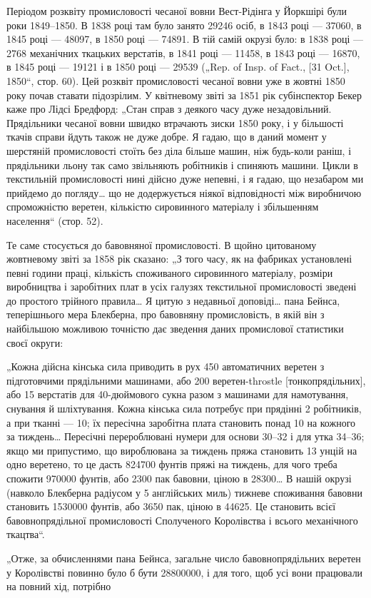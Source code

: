 
Періодом розквіту промисловості чесаної вовни Вест-Рідінга
у Йоркшірі були роки 1849--1850. В 1838 році там було занято
\num{29246} осіб, в 1843 році — \num{37060}, в 1845 році — \num{48097}, в 1850 році —
\num{74891}. В тій самій окрузі було: в 1838 році — 2768 механічних
ткацьких верстатів, в 1841 році — \num{11458}, в 1843 році — \num{16870},
в 1845 році — \num{19121} і в 1850 році — \num{29539} („Rep. of Insp. of Fact.,
[31 Oct.], 1850“, стор. 60). Цей розквіт промисловості чесаної
вовни уже в жовтні 1850 року почав ставати підозрілим. У квітневому
звіті за 1851 рік субінспектор Бекер каже про Лідсі Бредфорд:
„Стан справ з деякого часу дуже незадовільний. Прядільники
чесаної вовни швидко втрачають зиски 1850 року, і у більшості
ткачів справи йдуть також не дуже добре. Я гадаю, що
в даний момент у шерстяній промисловості стоїть без діла більше
машин, ніж будь-коли раніш, і прядільники льону так само звільняють
робітників і спиняють машини. Цикли в текстильній промисловості
нині дійсно дуже непевні, і я гадаю, що незабаром
ми прийдемо до погляду\dots{} що не додержується ніякої відповідності
між виробничою спроможністю веретен, кількістю сировинного
матеріалу і збільшенням населення“ (стор. 52).

Те саме стосується до бавовняної промисловості. В щойно
цитованому жовтневому звіті за 1858 рік сказано: „З того часу,
як на фабриках установлені певні години праці, кількість споживаного
сировинного матеріалу, розміри виробництва і заробітних
плат в усіх галузях текстильної промисловості зведені
до простого трійного правила\dots{} Я цитую з недавньої доповіді\dots{}
пана Бейнса, теперішнього мера Блекберна, про бавовняну промисловість,
в якій він з найбільшою можливою точністю дає
зведення даних промислової статистики своєї округи:

„Кожна дійсна кінська сила приводить в рух 450 автоматичних
веретен з підготовчими прядільними машинами, або 200 веретен-throstle
[тонкопрядільних], або 15 верстатів для 40-дюймового
сукна разом з машинами для намотування, снування й
шліхтування. Кожна кінська сила потребує при прядінні 2 робітників,
а при тканні — 10; їх пересічна заробітна плата становить
понад 10 на кожного за тиждень\dots{} Пересічні
перероблювані нумери для основи 30--32 і для утка 34--36;
якщо ми припустимо, що вироблювана за тиждень пряжа становить
13 унцій на одно веретено, то це дасть \num{824700} фунтів
пряжі на тиждень, для чого треба спожити \num{970000} фунтів, або
2300 пак бавовни, ціною в \num{28300}\dots{} В нашій
окрузі (навколо Блекберна радіусом у 5 англійських миль)
тижневе споживання бавовни становить \num{1530000} фунтів, або
3650 пак, ціною в \num{44625}. Це становить 
всієї бавовнопрядільної промисловості Сполученого Королівства
і   всього механічного ткацтва“.

„Отже, за обчисленнями пана Бейнса, загальне число бавовнопрядільних
веретен у Королівстві повинно було б бути \num{28800000},
і для того, щоб усі вони працювали на повний хід, потрібно
\parbreak{}  %
